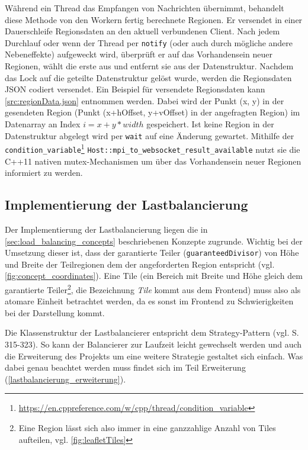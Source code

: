 Während ein Thread das Empfangen von Nachrichten übernimmt, behandelt diese Methode von den Workern fertig berechnete Regionen.
Er versendet in einer Dauerschleife Regionsdaten an den aktuell verbundenen Client.
Nach jedem Durchlauf oder wenn der Thread per \verb|notify| (oder auch durch mögliche andere Nebeneffekte) aufgeweckt wird,
überprüft er auf das Vorhandensein neuer Regionen, wählt die erste aus und entfernt sie aus der Datenstruktur.
Nachdem das Lock auf die geteilte Datenstruktur gelöst wurde, werden die Regionsdaten JSON codiert versendet.
Ein Beispiel für versendete Regionsdaten kann \autoref{src:regionData.json} entnommen werden.
Dabei wird der Punkt (x, y) in der gesendeten Region (Punkt (x+hOffset, y+vOffset) in der angefragten Region)
im Datenarray an Index $i = x + y * width$ gespeichert.
Ist keine Region in der Datenstruktur abgelegt wird per \verb|wait| auf eine Änderung gewartet.
Mithilfe der \verb|condition_variable|\footnote{\url{https://en.cppreference.com/w/cpp/thread/condition_variable}} \verb|Host::mpi_to_websocket_result_available|
nutzt sie die C++11 nativen mutex-Mechanismen um über das Vorhandensein neuer Regionen informiert zu werden.

\begin{figure}[!h]
	
\end{figure}

\subsection{Implementierung der Lastbalancierung}\label{sec:load_balancing}
Der Implementierung der Lastbalancierung liegen die in \autoref{sec:load_balancing_concepts} beschriebenen Konzepte zugrunde.
Wichtig bei der Umsetzung dieser ist, dass der garantierte Teiler (\verb|guaranteedDivisor|) von Höhe und Breite der Teilregionen dem der angeforderten Region entspricht (vgl. \autoref{fig:concept_coordinates}).
Eine Tile (ein Bereich mit Breite und Höhe gleich dem garantierte Teiler\footnote{Eine Region lässt sich also immer in eine ganzzahlige Anzahl von Tiles aufteilen, vgl. \autoref{fig:leafletTiles}}, die Bezeichnung \textit{Tile} kommt aus dem Frontend) muss also als atomare Einheit betrachtet werden, da es sonst im Frontend zu Schwierigkeiten bei der Darstellung kommt.

Die Klassenstruktur der Lastbalancierer entspricht dem Strategy-Pattern (vgl. \cite{gamma_design_1995} S. 315-323). So kann der Balancierer zur Laufzeit leicht gewechselt werden und auch die Erweiterung des Projekts um eine weitere Strategie gestaltet sich einfach.
Was dabei genau beachtet werden muss findet sich im Teil Erweiterung (\ref{lastbalancierung_erweiterung}).

